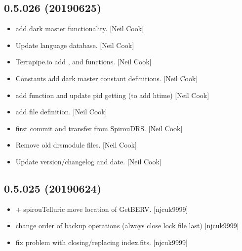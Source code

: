 \documentclass[a4paper,10pt,english]{report}
\begin{document}
\subsection{0.5.026 (2019\sphinxhyphen{}06\sphinxhyphen{}25)}
\label{\detokenize{misc/changelog:id129}}\begin{itemize}
\item {} 
 \sphinxhyphen{} add dark master functionality. {[}Neil Cook{]}

\item {} 
Update language database. {[}Neil Cook{]}

\item {} 
Terrapipe.io \sphinxhyphen{} add ,  and 
functions. {[}Neil Cook{]}

\item {} 
Constants \sphinxhyphen{} add dark master constant definitions. {[}Neil Cook{]}

\item {} 
 \sphinxhyphen{} add function  and update pid
getting (to add htime) {[}Neil Cook{]}

\item {} 
 \sphinxhyphen{} add  file definition. {[}Neil Cook{]}

\item {} 
 \sphinxhyphen{} first commit and transfer from SpirouDRS.
{[}Neil Cook{]}

\item {} 
Remove old drsmodule files. {[}Neil Cook{]}

\item {} 
Update version/changelog and date. {[}Neil Cook{]}

\end{itemize}


\subsection{0.5.025 (2019\sphinxhyphen{}06\sphinxhyphen{}24)}
\label{\detokenize{misc/changelog:id130}}\begin{itemize}
\item {} 
 + spirouTelluric \sphinxhyphen{} move location of GetBERV.
{[}njcuk9999{]}

\item {} 
 \sphinxhyphen{} change order of backup operations (always close lock
file last) {[}njcuk9999{]}

\item {} 
 \sphinxhyphen{} fix problem with closing/replacing index.fits.
{[}njcuk9999{]}

\end{itemize}
\end{document}
